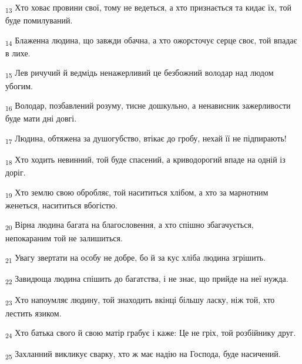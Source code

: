 \begin{tcolorbox}
\textsubscript{13} Хто ховає провини свої, тому не ведеться, а хто признається та кидає їх, той буде помилуваний.
\end{tcolorbox}
\begin{tcolorbox}
\textsubscript{14} Блаженна людина, що завжди обачна, а хто ожорсточує серце своє, той впадає в лихе.
\end{tcolorbox}
\begin{tcolorbox}
\textsubscript{15} Лев ричучий й ведмідь ненажерливий це безбожний володар над людом убогим.
\end{tcolorbox}
\begin{tcolorbox}
\textsubscript{16} Володар, позбавлений розуму, тисне дошкульно, а ненависник зажерливости буде мати дні довгі.
\end{tcolorbox}
\begin{tcolorbox}
\textsubscript{17} Людина, обтяжена за душогубство, втікає до гробу, нехай її не підпирають!
\end{tcolorbox}
\begin{tcolorbox}
\textsubscript{18} Хто ходить невинний, той буде спасений, а криводорогий впаде на одній із доріг.
\end{tcolorbox}
\begin{tcolorbox}
\textsubscript{19} Хто землю свою обробляє, той насититься хлібом, а хто за марнотним женеться, насититься вбогістю.
\end{tcolorbox}
\begin{tcolorbox}
\textsubscript{20} Вірна людина багата на благословення, а хто спішно збагачується, непокараним той не залишиться.
\end{tcolorbox}
\begin{tcolorbox}
\textsubscript{21} Увагу звертати на особу не добре, бо й за кус хліба людина згрішить.
\end{tcolorbox}
\begin{tcolorbox}
\textsubscript{22} Завидюща людина спішить до багатства, і не знає, що прийде на неї нужда.
\end{tcolorbox}
\begin{tcolorbox}
\textsubscript{23} Хто напоумляє людину, той знаходить вкінці більшу ласку, ніж той, хто лестить язиком.
\end{tcolorbox}
\begin{tcolorbox}
\textsubscript{24} Хто батька свого й свою матір грабує і каже: Це не гріх, той розбійнику друг.
\end{tcolorbox}
\begin{tcolorbox}
\textsubscript{25} Захланний викликує сварку, хто ж має надію на Господа, буде насичений.
\end{tcolorbox}
